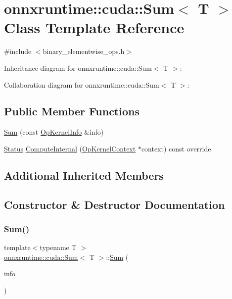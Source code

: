 \hypertarget{classonnxruntime_1_1cuda_1_1Sum}{}\section{onnxruntime\+:\+:cuda\+:\+:Sum$<$ T $>$ Class Template Reference}
\label{classonnxruntime_1_1cuda_1_1Sum}


{\ttfamily \#include $<$binary\+\_\+elementwise\+\_\+ops.\+h$>$}



Inheritance diagram for onnxruntime\+:\+:cuda\+:\+:Sum$<$ T $>$\+:


Collaboration diagram for onnxruntime\+:\+:cuda\+:\+:Sum$<$ T $>$\+:
\subsection*{Public Member Functions}
\begin{DoxyCompactItemize}
\item 
\mbox{\hyperlink{classonnxruntime_1_1cuda_1_1Sum_a728700842574fe54ce95a3a7983da30a}{Sum}} (const \mbox{\hyperlink{classonnxruntime_1_1OpKernelInfo}{Op\+Kernel\+Info}} \&info)
\item 
\mbox{\hyperlink{classonnxruntime_1_1common_1_1Status}{Status}} \mbox{\hyperlink{classonnxruntime_1_1cuda_1_1Sum_a07a1e4385aad90a558f83fc7abf5e93b}{Compute\+Internal}} (\mbox{\hyperlink{classonnxruntime_1_1OpKernelContext}{Op\+Kernel\+Context}} $\ast$context) const override
\end{DoxyCompactItemize}
\subsection*{Additional Inherited Members}


\subsection{Constructor \& Destructor Documentation}
\mbox{\label{classonnxruntime_1_1cuda_1_1Sum_a728700842574fe54ce95a3a7983da30a}} 
\subsubsection{\texorpdfstring{Sum()}{Sum()}}
{\footnotesize\ttfamily template$<$typename T $>$ \\
\mbox{\hyperlink{classonnxruntime_1_1cuda_1_1Sum}{onnxruntime\+::cuda\+::\+Sum}}$<$ T $>$\+::\mbox{\hyperlink{classonnxruntime_1_1cuda_1_1Sum}{Sum}} (\begin{DoxyParamCaption}\item[{const \mbox{\hyperlink{classonnxruntime_1_1OpKernelInfo}{Op\+Kernel\+Info}} \&}]{info }\end{DoxyParamCaption})\hspace{0.3cm}{\ttfamily [inline]}}



